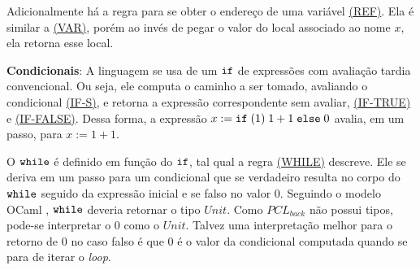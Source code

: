 

Adicionalmente há a regra para se obter o endereço de uma variável \hyperref[rule:ref]{(REF)}. Ela é similar a \hyperref[rule:var]{(VAR)}, porém ao invés de pegar o valor do local associado ao nome $x$, ela retorna esse local.

\textbf{Condicionais}: A linguagem se usa de um $\texttt{if}$ de expressões com avaliação tardia convencional. Ou seja, ele computa o caminho a ser tomado, avaliando o condicional \hyperref[rule:if-s]{(IF-S)}, e retorna a expressão correspondente sem avaliar, \hyperref[rule:if-true]{(IF-TRUE)} e \hyperref[rule:if-false]{(IF-FALSE)}. Dessa forma, a expressão $x := \texttt{if}\;(1)\; 1 + 1 \;\texttt{else}\; 0$ avalia, em um passo, para $x := 1 + 1$.




    

O $\texttt{while}$ é definido em função do $\texttt{if}$, tal qual a regra \hyperref[rule:while]{(WHILE)} descreve. Ele se deriva em um passo para um condicional que se verdadeiro resulta no corpo do $\texttt{while}$ seguido da expressão inicial e se falso no valor 0. Seguindo o modelo OCaml \cite{leroy3ocaml}, $\texttt{while}$ deveria retornar o tipo $Unit$. Como $PCL_{back}$ não possui tipos, pode-se interpretar o 0 como o $Unit$. Talvez uma interpretação melhor para o retorno de 0 no caso falso é que 0 é o valor da condicional computada quando se para de iterar o \emph{loop}.

